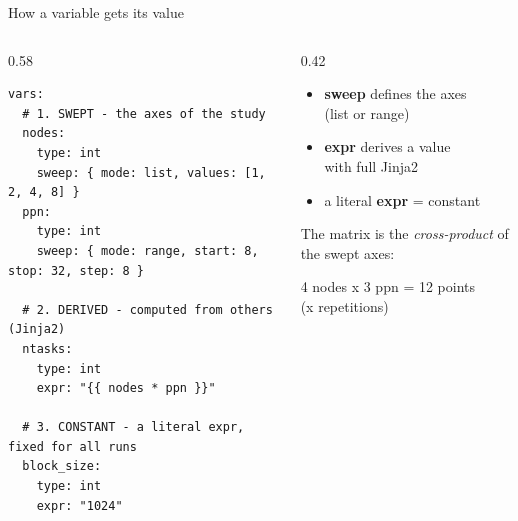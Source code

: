 \documentclass[aspectratio=169,11pt]{beamer}
\newcommand{\code}[1]{{\ttfamily\small\color{iopsNavy}#1}}
\newcommand{\hl}[1]{{\color{iopsPink}\bfseries #1}}
\begin{document}
\begin{frame}[fragile]{How a variable gets its value}
  \begin{columns}[T]
    \begin{column}{0.58\textwidth}
\begin{lstlisting}[style=yaml]
vars:
  # 1. SWEPT - the axes of the study
  nodes:
    type: int
    sweep: { mode: list, values: [1, 2, 4, 8] }
  ppn:
    type: int
    sweep: { mode: range, start: 8, stop: 32, step: 8 }

  # 2. DERIVED - computed from others (Jinja2)
  ntasks:
    type: int
    expr: "{{ nodes * ppn }}"

  # 3. CONSTANT - a literal expr, fixed for all runs
  block_size:
    type: int
    expr: "1024"
\end{lstlisting}
    \end{column}
    \begin{column}{0.42\textwidth}
      \begin{itemize}
        \item \hl{sweep} defines the axes\\ (\code{list} or \code{range})
        \item \hl{expr} derives a value\\ with full Jinja2
        \item a literal \hl{expr} = constant
      \end{itemize}
      \vspace{0.4em}
      The matrix is the \emph{cross-product} of the swept axes:
      \begin{center}
        \code{4 nodes x 3 ppn = 12} points\\(x repetitions)
      \end{center}
    \end{column}
  \end{columns}
\end{frame}
\end{document}
